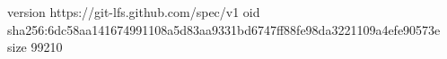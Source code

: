 version https://git-lfs.github.com/spec/v1
oid sha256:6dc58aa141674991108a5d83aa9331bd6747ff88fe98da3221109a4efe90573e
size 99210
